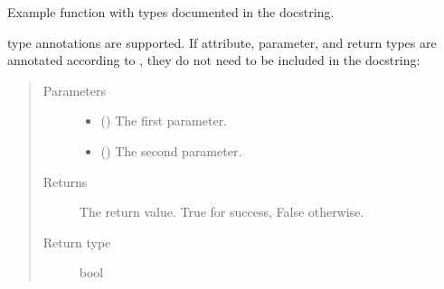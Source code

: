 \documentclass[letterpaper,10pt,english]{sphinxmanual}
\begin{document}
\begin{fulllineitems}
\label{\detokenize{source/example:example.function_with_types_in_docstring}}
\pysigstartsignatures
{}
\pysigstopsignatures
\sphinxAtStartPar
Example function with types documented in the docstring.

\sphinxAtStartPar
{} type annotations are supported. If attribute, parameter, and
return types are annotated according to , they do not need to be
included in the docstring:
\begin{quote}\begin{description}
\item[{Parameters}] \leavevmode\begin{itemize}
\item {} 
\sphinxAtStartPar
{} () \textendash{} The first parameter.

\item {} 
\sphinxAtStartPar
{} () \textendash{} The second parameter.

\end{itemize}

\item[{Returns}] \leavevmode
\sphinxAtStartPar
The return value. True for success, False otherwise.

\item[{Return type}] \leavevmode
\sphinxAtStartPar
bool

\end{description}\end{quote}

\end{fulllineitems}

\end{document}
